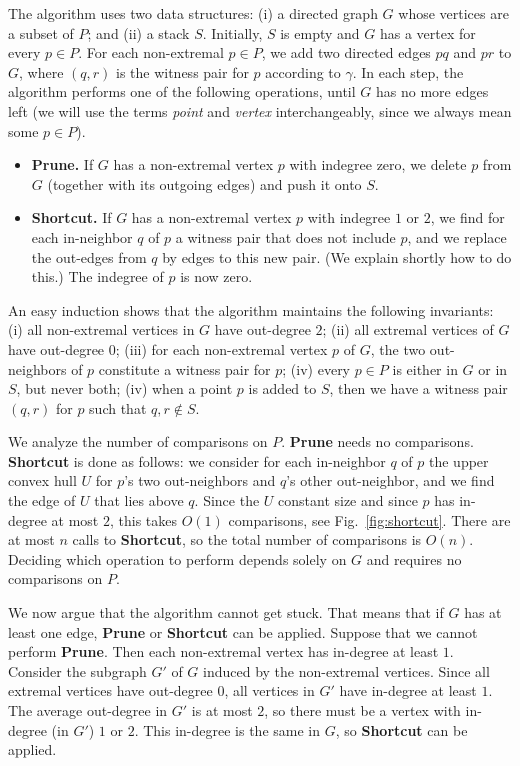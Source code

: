 \documentclass[letterpaper,11pt]{article}
\begin{document}
The algorithm uses two data structures: 
(i) a directed graph $G$ whose vertices 
are a subset of $P$; and (ii) a stack $S$.  
Initially, $S$ is empty and $G$ has 
a vertex for every $p \in P$. For each 
non-extremal $p \in P$, we add 
two directed edges $pq$ and $pr$ to $G$, 
where $(q,r)$ is the witness pair 
for $p$ according to $\gamma$. 
In each step, the algorithm performs 
one of the following operations, until 
$G$ has no more edges left (we will 
use the terms \emph{point} and 
\emph{vertex} interchangeably, since 
we always mean some $p \in P$).
\begin{itemize}
  \item \textbf{Prune.} If $G$ has 
    a non-extremal vertex $p$ with 
    indegree zero, we delete $p$ from 
    $G$ (together with its outgoing
    edges) and push it onto $S$.
	
  \item \textbf{Shortcut.} If $G$ 
    has a non-extremal vertex $p$ with
     indegree $1$ or $2$, we find 
     for each in-neighbor $q$ of $p$ 
     a witness pair that does not include 
     $p$, and we replace the out-edges 
     from $q$ by edges to this 
     new pair. (We explain shortly 
     how to do this.) The indegree of 
     $p$ is now zero. 
\end{itemize}
An easy induction shows that the 
algorithm maintains the following 
invariants: (i) all non-extremal 
vertices in $G$ have out-degree $2$; 
(ii) all extremal vertices of $G$ 
have out-degree $0$; (iii) for 
each non-extremal vertex $p$ of $G$, 
the two out-neighbors of $p$ 
constitute a witness pair for $p$; 
(iv) every $p \in P$ is either in $G$ 
or in $S$, but never both; (iv) when 
a point $p$ is added to $S$, then 
we have a witness pair $(q,r)$ for 
$p$ such that $q,r \notin S$. 

We analyze the number of comparisons 
on $P$. \textbf{Prune} needs no 
comparisons.  \textbf{Shortcut} is 
done as follows: we consider for each
in-neighbor $q$ of $p$ the upper convex 
hull $U$ for $p$'s two out-neighbors
and $q$'s other out-neighbor, and we 
find the edge of $U$ that lies above 
$q$. Since the $U$ constant size and 
since $p$ has in-degree at most $2$, 
this takes $O(1)$ comparisons,
see Fig.~\ref{fig:shortcut}.
There are at most $n$ calls to
\textbf{Shortcut}, so the total number 
of comparisons is $O(n)$.  Deciding which 
operation to perform depends solely on 
$G$ and requires no comparisons on $P$. 

We now argue that the algorithm cannot get 
stuck. That means that if $G$ has at 
least one edge, \textbf{Prune} or 
\textbf{Shortcut} can be applied. 
Suppose that we cannot perform 
\textbf{Prune}. Then each non-extremal 
vertex has in-degree at least $1$. 
Consider the subgraph $G'$ of $G$ 
induced by the non-extremal vertices. 
Since all extremal vertices have out-degree $0$,
all vertices in $G'$ have in-degree 
at least $1$. The average out-degree 
in $G'$ is at most $2$, so there must be 
a vertex with in-degree (in $G'$) $1$ or 
$2$.  This in-degree is the same in $G$, 
so \textbf{Shortcut} can be applied.
\end{document}
